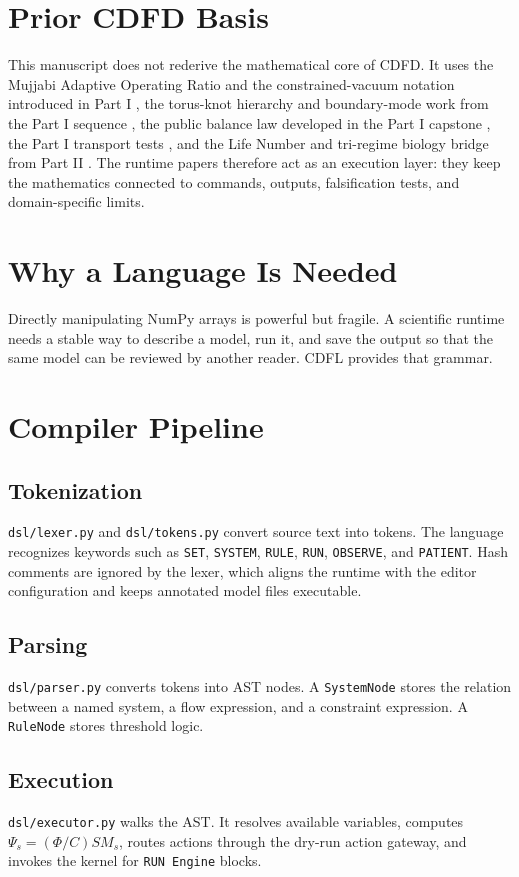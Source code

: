 \documentclass[12pt,a4paper]{article}
\begin{document}
\section{Prior CDFD Basis}
This manuscript does not rederive the mathematical core of CDFD. It uses the
Mujjabi Adaptive Operating Ratio and the constrained-vacuum notation introduced
in Part I \cite{MujjabiI2026}, the torus-knot hierarchy and boundary-mode work
from the Part I sequence \cite{MujjabiVI2026,MujjabiIX2026}, the public balance
law developed in the Part I capstone \cite{MujjabiX2026}, the Part I transport
tests \cite{MujjabiXII2026}, and the Life Number and tri-regime biology bridge
from Part II \cite{MujjabiPartII2026}. The runtime papers therefore act as an
execution layer: they keep the mathematics connected to commands, outputs,
falsification tests, and domain-specific limits.


\section{Why a Language Is Needed}
Directly manipulating NumPy arrays is powerful but fragile. A scientific runtime
needs a stable way to describe a model, run it, and save the output so that the
same model can be reviewed by another reader. CDFL provides that grammar.

\section{Compiler Pipeline}
\subsection{Tokenization}
\texttt{dsl/lexer.py} and \texttt{dsl/tokens.py} convert source text into tokens.
The language recognizes keywords such as \texttt{SET}, \texttt{SYSTEM},
\texttt{RULE}, \texttt{RUN}, \texttt{OBSERVE}, and \texttt{PATIENT}. Hash
comments are ignored by the lexer, which aligns the runtime with the editor
configuration and keeps annotated model files executable.

\subsection{Parsing}
\texttt{dsl/parser.py} converts tokens into AST nodes. A \texttt{SystemNode}
stores the relation between a named system, a flow expression, and a constraint
expression. A \texttt{RuleNode} stores threshold logic.

\subsection{Execution}
\texttt{dsl/executor.py} walks the AST. It resolves available variables, computes
$\Psi_s=(\Phi/C)S M_s$, routes actions through the dry-run action gateway, and
invokes the kernel for \texttt{RUN Engine} blocks.
\end{document}
